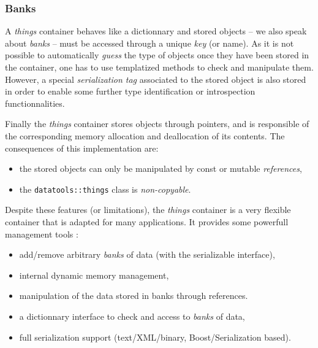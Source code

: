 \subsubsection{Banks}

A  \emph{things}  container  behaves  like a  dictionnary  and  stored
objects  -- we  also  speak  about \emph{banks}  --  must be  accessed
through  a unique  \emph{key}  (or name).  As  it is  not possible  to
automatically  \emph{guess} the type  of objects  once they  have been
stored in the  container, one has to use  templatized methods to check
and  manipulate  them.  However,  a special  \emph{serialization  tag}
associated to the stored object is also stored in order to enable some
further type identification or introspection functionnalities.

Finally the  \emph{things} container stores  objects through pointers,
and  is  responsible  of   the  corresponding  memory  allocation  and
deallocation of its contents.  The consequences of this implementation
are:
\begin{itemize}

\item the stored  objects can only be manipulated  by const or mutable
  \emph{references},

\item      the     \texttt{datatools::things}      class     is
  \emph{non-copyable}.

\end{itemize}

\pn Despite these features (or limitations), the  \emph{things} container
is a very flexible container that is adapted for many applications.
It provides some powerfull management tools :
\begin{itemize}

\item add/remove arbitrary \emph{banks} of data
  (with the serializable interface),

\item internal dynamic memory management,

\item manipulation of the data stored in banks through references.

\item a dictionnary interface to check and access to \emph{banks} of data,

\item full serialization support (text/XML/binary, Boost/Serialization based).

\end{itemize}


